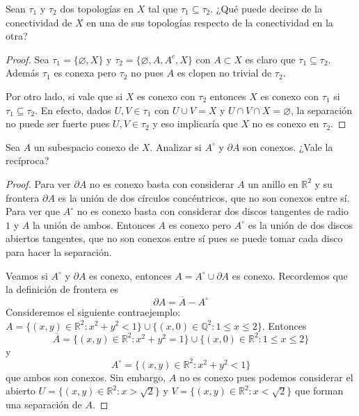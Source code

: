 \documentclass{article}
\theoremstyle{definition}
\newcommand{\R}{\mathbb{R}}
\newcommand{\Q}{\mathbb{Q}}
\newcommand{\cl}[1]{\overline{#1}}              %
\newcommand{\Int}[1]{{#1}^\circ}                %
\newenvironment{ejercicio}[1]{\begin{trivlist}
\item[\hskip \labelsep {\bfseries Ejercicio}\hskip \labelsep {\bfseries #1.}]}{\end{trivlist}}
\begin{document}
\begin{ejercicio}{3}
    Sean \(\tau_1\) y \(\tau_2\) dos topologías en \(X\) tal que \(\tau_1 \subseteq \tau_2\). ¿Qué puede decirse de la conectividad de \(X\) en una de sus topologías respecto de la conectividad en la otra?
\end{ejercicio}
\begin{proof}
    Sea \( \tau_1 = \{ \varnothing, X \} \) y \( \tau_2 = \{ \varnothing, A, A^c, X \} \) con \( A \subset X \) es claro que \( \tau_1 \subseteq \tau_2 \).
    Además \( \tau_1 \) es conexa pero \( \tau_2 \) no pues \( A \) es clopen no trivial de \( \tau_2 \).

    Por otro lado, si vale que si \( X \) es conexo con \( \tau_2 \) entonces \( X \) es conexo con \( \tau_1 \) si \( \tau_1 \subseteq \tau_2 \). En efecto,
    dados \( U, V \in \tau_1 \) con \( U \cup V = X \) y \( U \cap V \cap X = \varnothing \), la separación no puede ser fuerte pues \( U, V \in \tau_2 \) y eso implicaría que \( X \) no es conexo en \( \tau_2 \).
\end{proof}

\begin{ejercicio}{4}
    Sea \(A\) un subespacio conexo de \(X\). Analizar si \( \Int{A} \) y \(\partial A\) son conexos. ¿Vale la recíproca?
\end{ejercicio}
\begin{proof}
    Para ver \( \partial A \) no es conexo basta con considerar \( A \) un anillo en \( \R^2 \) y su frontera \( \partial A \) es la unión de dos círculos concéntricos, que no son conexos entre sí.
    Para ver que \( \Int{A} \) no es conexo basta con considerar dos discos tangentes de radio \( 1 \) y \( A \) la unión de ambos. Entonces \( A \)
    es conexo pero \( \Int{A} \) es la unión de dos discos abiertos tangentes, que no son conexos entre sí pues se puede tomar cada disco para hacer la separación.

    Veamos si \( \Int{A} \) y \( \partial A \) es conexo, entonces \( A = \Int{A} \cup \partial A \) es conexo. Recordemos que la definición de frontera es \[
        \partial A = \cl{A} - \Int{A}
    \]
    Consideremos el siguiente contraejemplo: \( A = \{ (x, y) \in \R^2 : x^2 + y^2 < 1 \} \cup \{ (x, 0) \in \Q^2 : 1 \leq x \leq 2 \} \).
    Entonces \[ \cl{A} = \{ (x, y) \in \R^2 : x^2 + y^2 = 1 \} \cup \{ (x, 0) \in \R^2 : 1 \leq x \leq 2 \} \] y \[ \Int{A} = \{ (x, y) \in \R^2 : x^2 + y^2 < 1 \} \] que ambos son conexos. Sin embargo,
    \( A \) no es conexo pues podemos considerar el abierto \( U = \{ (x, y) \in \R^2 : x > \sqrt{2} \} \) y \( V = \{ (x, y) \in \R^2 : x < \sqrt{2} \} \) que forman una separación de \( A \).
\end{proof}
\end{document}
